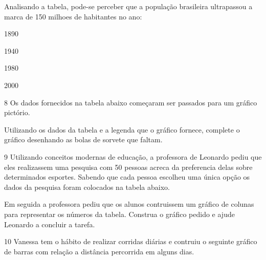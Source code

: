 Analisando a tabela, pode-se perceber que a população brasileira
ultrapassou a marca de 150 milhoes de habitantes no ano:

\begin{escolha}
\item
  1890
\item
  1940
\item
  1980
\item
  2000
\end{escolha}


\num{8} Os dados fornecidos na tabela abaixo começaram ser passados para um
gráfico pictório.

%

Utilizando os dados da tabela e a legenda que o gráfico fornece,
complete o gráfico desenhando as bolas de sorvete que faltam.


\num{9} Utilizando conceitos modernas de educação, a professora de Leonardo
pediu que eles realizassem uma pesquisa com 50 pessoas acreca da
preferencia delas sobre determinados esportes. Sabendo que cada pessoa
escolheu uma única opção os dados da pesquisa foram colocados na tabela
abaixo.


Em seguida a professora pediu que os alunos contruissem um gráfico de
colunas para representar os números da tabela. Construa o gráfico pedido
e ajude Leonardo a concluir a tarefa.


\num{10} Vanessa tem o hábito de realizar corridas diárias e contruiu o
seguinte gráfico de barras com relação a distância percorrida em alguns
dias.


